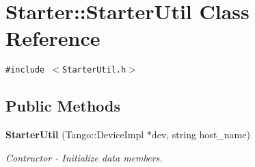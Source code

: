 \section{Starter::Starter\-Util  Class Reference}
\label{classStarter_1_1StarterUtil}
{\tt \#include $<$Starter\-Util.h$>$}

\subsection*{Public Methods}
{\bf }\par
\begin{CompactItemize}
\item 
{\bf Starter\-Util} (Tango::Device\-Impl $\ast$dev, string host\_\-name)
\begin{CompactList}\small\item\em Contructor - Initialize data members.\item\end{CompactList}\end{CompactItemize}

